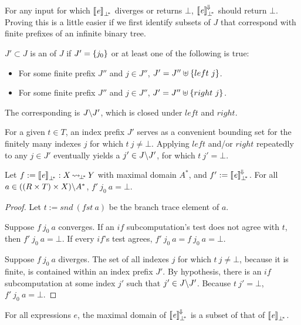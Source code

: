 \documentclass[preprint]{sigplanconf}
\newcommand{\arrow}{\rightsquigarrow}
\newcommand{\conv}{^{\mspace{-2mu}\Downarrow\mspace{-2mu}}}
\newcommand{\meaningofconv}[1]{\left\llbracket{#1}\right\rrbracket\conv}
\newcommand{\pbot}{{\bot^{\mspace{-4mu}*}}}
\DeclareMathOperator{\pbotto}{\arrow_{\mspace{-3mu}\pbot}}
\begin{document}
For any input for which $\meaningof{\mathit{e}}_\pbot$ diverges or returns $\bot$, $\meaningofconv{\mathit{e}}_\pbot$ should return $\bot$.
Proving this is a little easier if we first identify subsets of $J$ that correspond with finite prefixes of an infinite binary tree.

\begin{definition}
$J' \subset J$ is an  of $J$ if $J' = \{{j_0}\}$ or at least one of the following is true:
\begin{itemize}
	\item For some finite prefix $J''$ and $j \in J''$, $J' = J'' \uplus \{{left~j}\}$.
	\item For some finite prefix $J''$ and $j \in J''$, $J' = J'' \uplus \{{right~j}\}$.
\end{itemize}
\end{definition}

The corresponding  is $J \backslash J'$, which is closed under $left$ and $right$.

For a given $t \in T$, an index prefix $J'$ serves as a convenient bounding set for the finitely many indexes $j$ for which $t~j \neq \bot$.
Applying $left$ and/or $right$ repeatedly to any $j \in J'$ eventually yields a $j' \in J \backslash J'$, for which $t~j' = \bot$.

\begin{theorem}
Let $f := \meaningof{\mathit{e}}_\pbot : X \pbotto Y$ with maximal domain $A^*$, and $f' := \meaningofconv{\mathit{e}}_\pbot$.
For all $a \in ((R \times T) \times X) \backslash A^*$, $f'~j_0~a = \bot$.
\end{theorem}
\begin{proof}
Let $t := snd~(fst~a)$ be the branch trace element of $a$.

Suppose $f~j_0~a$ converges.
If an $if$ subcomputation's test does not agree with $t$, then $f'~j_0~a = \bot$.
If every $if$'s test agrees, $f'~j_0~a = f~j_0~a = \bot$.

Suppose $f~j_0~a$ diverges.
The set of all indexes $j$ for which $t~j \neq \bot$, because it is finite, is contained within an index prefix $J'$.
By hypothesis, there is an $if$ subcomputation at some index $j'$ such that $j' \in J \backslash J'$.
Because $t~j' = \bot$, $f'~j_0~a = \bot$.
\end{proof}

\begin{corollary}
For all expressions $\mathit{e}$, the maximal domain of $\meaningofconv{\mathit{e}}_\pbot$ is a subset of that of $\meaningof{\mathit{e}}_\pbot$.
\end{corollary}
\end{document}
